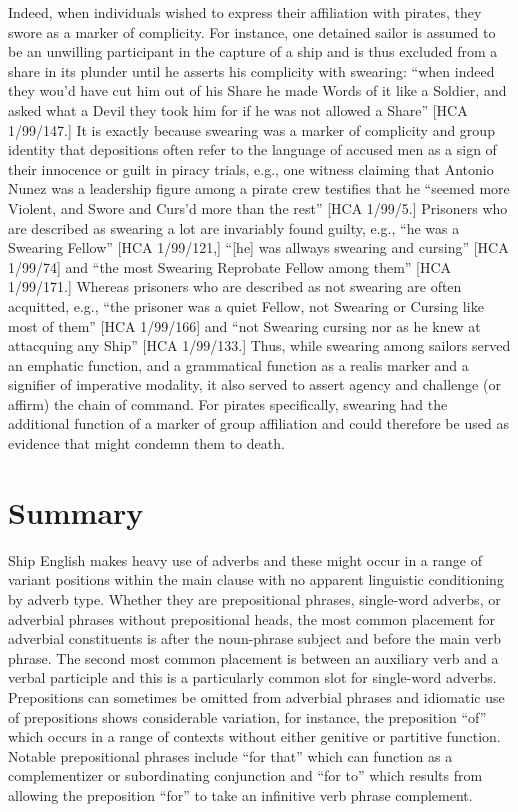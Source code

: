 Indeed, when individuals wished to express their affiliation with pirates, they swore as a marker of complicity. For instance, one detained sailor is assumed to be an unwilling participant in the capture of a ship and is thus excluded from a share in its plunder until he asserts his complicity with swearing: “when indeed they wou’d have cut him out of his Share he made Words of it like a Soldier, and asked what a Devil they took him for if he was not allowed a Share” [HCA 1/99/147.] It is exactly because swearing was a marker of complicity and group identity that depositions often refer to the language of accused men as a sign of their innocence or guilt in piracy trials, e.g., one witness claiming that Antonio Nunez was a leadership figure among a pirate crew testifies that he “seemed more Violent, and Swore and Curs’d more than the rest” [HCA 1/99/5.] Prisoners who are described as swearing a lot are invariably found guilty, e.g., “he was a Swearing Fellow” [HCA 1/99/121,] “[he] was allways swearing and cursing” [HCA 1/99/74] and “the most Swearing Reprobate Fellow among them” [HCA 1/99/171.] Whereas prisoners who are described as not swearing are often acquitted, e.g., “the prisoner was a quiet Fellow, not Swearing or Cursing like most of them” [HCA 1/99/166] and “not Swearing cursing nor as he knew at attacquing any Ship” [HCA 1/99/133.] Thus, while swearing among sailors served an emphatic function, and a grammatical function as a realis marker and a signifier of imperative modality, it also served to assert agency and challenge (or affirm) the chain of command.  For pirates specifically, swearing had the additional function of a marker of group affiliation and could therefore be used as evidence that might condemn them to death. 

\section{\textbf{Summary}}%

  Ship English makes heavy use of adverbs and these might occur in a range of variant positions within the main clause with no apparent linguistic conditioning by adverb type. Whether they are prepositional phrases, single-word adverbs, or adverbial phrases without prepositional heads, the most common placement for adverbial constituents is after the noun-phrase subject and before the main verb phrase. The second most common placement is between an auxiliary verb and a verbal participle and this is a particularly common slot for single-word adverbs. Prepositions can sometimes be omitted from adverbial phrases and idiomatic use of prepositions shows considerable variation, for instance, the preposition “of” which occurs in a range of contexts without either genitive or partitive function. Notable prepositional phrases include “for that” which can function as a complementizer or subordinating conjunction and “for to” which results from allowing the preposition “for” to take an infinitive verb phrase complement. 

